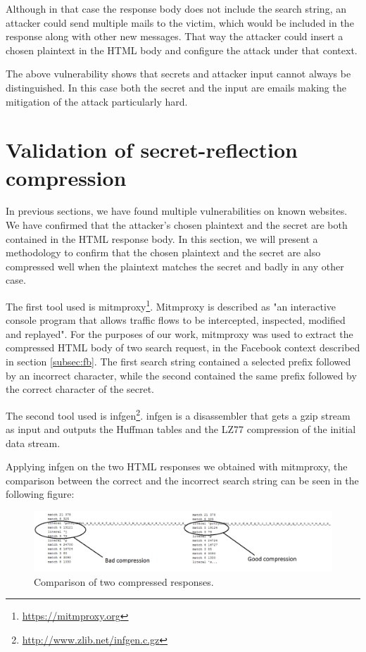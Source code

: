 Although in that case the response body does not include the search string, an
attacker could send multiple mails to the victim, which would be included in the
response along with other new messages. That way the attacker could insert a
chosen plaintext in the HTML body and configure the attack under that context.

The above vulnerability shows that secrets and attacker input cannot always be
distinguished. In this case both the secret and the input are emails
making the mitigation of the attack particularly hard.

\section{Validation of secret-reflection compression}\label{sec:mitmproxy}

In previous sections, we have found multiple vulnerabilities on known websites.
We have confirmed that the attacker's chosen plaintext and the secret are both
contained in the HTML response body. In this section, we will present a
methodology to confirm that the chosen plaintext and the secret are also
compressed well when the plaintext matches the secret and badly in any other
case.

The first tool used is mitmproxy\footnote{\url{https://mitmproxy.org}}.
Mitmproxy is described as "an interactive console program that allows traffic
flows to be intercepted, inspected, modified and replayed". For the purposes of
our work, mitmproxy was used to extract the compressed HTML body of two search
request, in the Facebook context described in section \ref{subsec:fb}. The first
search string contained a selected prefix followed by an incorrect character,
while the second contained the same prefix followed by the correct character of
the secret.

The second tool used is infgen\footnote{\url{http://www.zlib.net/infgen.c.gz}}.
infgen is a disassembler that gets a gzip stream as input and outputs the
Huffman tables and the LZ77 compression of the initial data stream.

Applying infgen on the two HTML responses we obtained with mitmproxy, the
comparison between the correct and the incorrect search string can be seen in
the following figure:

\begin{figure}[h] \caption{Comparison of two compressed responses.}
\includegraphics[width=1.15\textwidth]{diagrams/compression_comparison.png}\end{figure}

